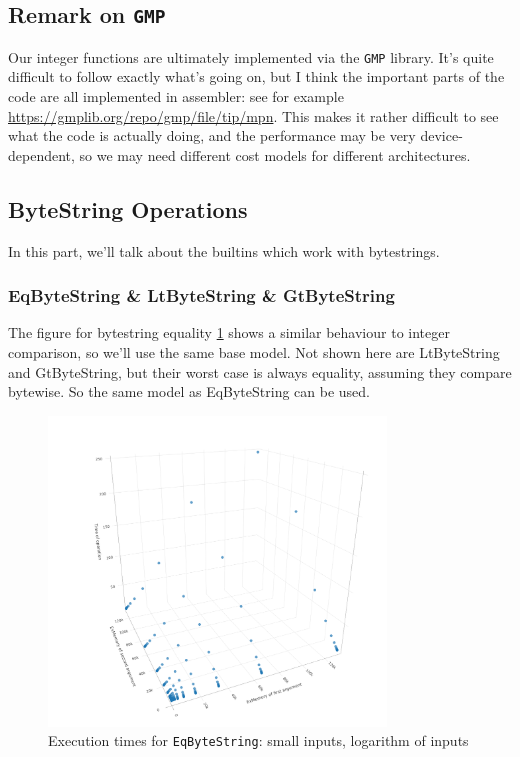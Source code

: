 \documentclass[a4paper]{article}
\begin{document}
\subsection*{Remark on \texttt{GMP}}
Our integer functions are ultimately implemented via the \texttt{GMP} library.
It's quite difficult to follow exactly what's going on, but I think
the important parts of the code are all implemented in assembler: see
for example \url{https://gmplib.org/repo/gmp/file/tip/mpn}.  This
makes it rather difficult to see what the code is actually doing, and
the performance may be very device-dependent, so we may need different
cost models for different architectures.

\subsection*{ByteString Operations}

In this part, we'll talk about the builtins which work with bytestrings.

\subsubsection*{EqByteString \& LtByteString \& GtByteString}

The figure for bytestring equality \ref{fig:EqByteString} shows a similar
behaviour to integer comparison, so we'll use the same base model. Not shown
here are LtByteString and GtByteString, but their worst case is always equality,
assuming they compare bytewise. So the same model as EqByteString can be used.

\begin{figure}
\centering
  \includegraphics[width=0.8\textwidth]{figures/EqByteString.png}
  \caption{Execution times for \texttt{EqByteString}: small inputs, logarithm of inputs}
  \label{fig:EqByteString}
\end{figure}
\end{document}
